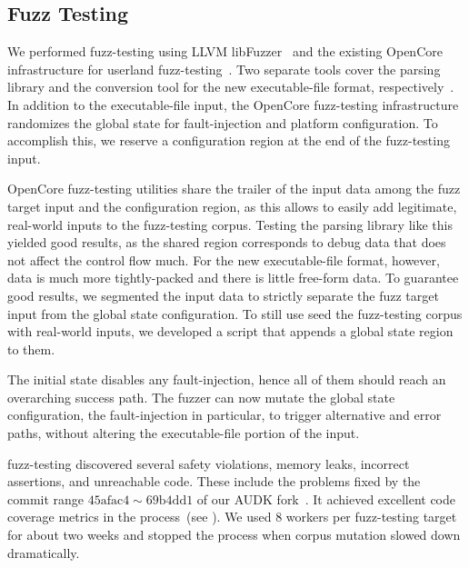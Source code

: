 \subsection{Fuzz Testing}

We performed \gls{fuzz-testing} using LLVM libFuzzer~\cite{libfuzzer} and the existing OpenCore infrastructure for userland \gls{fuzz-testing}~\cite{opencore}. Two separate tools cover the parsing library and the conversion tool for the new \gls{executable-file} format, respectively~\cite{thesis-git}. In addition to the \gls{executable-file} input, the OpenCore \gls{fuzz-testing} infrastructure randomizes the global state for \gls{fault-injection} and platform configuration. To accomplish this, we reserve a configuration region at the end of the \gls{fuzz-testing} input.

OpenCore \gls{fuzz-testing} utilities share the trailer of the input data among the fuzz target input and the configuration region, as this allows to easily add legitimate, real-world inputs to the \gls{fuzz-testing} corpus. Testing the  parsing library like this yielded good results, as the shared region corresponds to  debug data that does not affect the control flow much. For the new \gls{executable-file} format, however, data is much more tightly-packed and there is little free-form data. To guarantee good results, we segmented the input data to strictly separate the fuzz target input from the global state configuration. To still use seed the \gls{fuzz-testing} corpus with real-world inputs, we developed a script that appends a global state region to them.

The initial state disables any \gls{fault-injection}, hence all of them should reach an overarching success path. The fuzzer can now mutate the global state configuration, the \gls{fault-injection} in particular, to trigger alternative and error paths, without altering the \gls{executable-file} portion of the input.

\Gls{fuzz-testing} discovered several safety violations, memory leaks, incorrect assertions, and unreachable code. These include the problems fixed by the commit range $\mathrm{45afac4 \sim 69b4dd1}$ of our \gls{AUDK} fork~\cite{thesis-git}. It achieved excellent code coverage metrics in the process~(see ). We used $8$ workers per \gls{fuzz-testing} target for about two weeks and stopped the process when corpus mutation slowed down dramatically.



